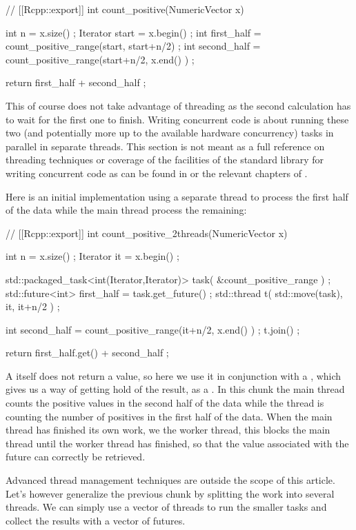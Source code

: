 \begin{example}
// [[Rcpp::export]]
int count_positive(NumericVector x){
  int n = x.size() ;
  Iterator start  = x.begin() ;
  int first_half  = count_positive_range(start, start+n/2) ;
  int second_half = count_positive_range(start+n/2, x.end() ) ;

  return first_half + second_half ;
}
\end{example}

This of course does not take advantage of threading as the second
calculation has to wait for the first one to finish. Writing concurrent
code is about running these two (and potentially more up to the available
hardware concurrency) tasks in parallel in separate threads.
This section is not meant as a full reference on threading techniques
or coverage of the facilities of the standard library for writing
concurrent code as can be found in \citep{williams2012} or the
relevant chapters of \citep{Stroustrup2013}.

Here is an initial implementation using a separate thread to process
the first half of the data while the main thread process the remaining:

\begin{example}
// [[Rcpp::export]]
int count_positive_2threads(NumericVector x){
  int n = x.size() ;
  Iterator it = x.begin() ;

  std::packaged_task<int(Iterator,Iterator)> task( &count_positive_range ) ;
  std::future<int> first_half = task.get_future() ;
  std::thread t( std::move(task), it, it+n/2 ) ;

  int second_half = count_positive_range(it+n/2, x.end() ) ;
  t.join() ;

  return first_half.get() + second_half ;
}
\end{example}

A  itself does not return a value, so here we use it in conjunction
with a , which gives us a way of getting hold of the result,
as a . In this chunk the main thread counts the positive
values in the second half of the data while the thread  is counting the
number of positives in the first half of the data. When the main thread has finished
its own work, we  the worker thread, this blocks the main thread until
the worker thread has finished, so that the value associated with the
future can correctly be retrieved.

Advanced thread management techniques are outside the scope of this
article. Let's however generalize the previous chunk by splitting the work
into several threads. We can simply use a vector of threads to run the smaller
tasks and collect the results with a vector of futures.

